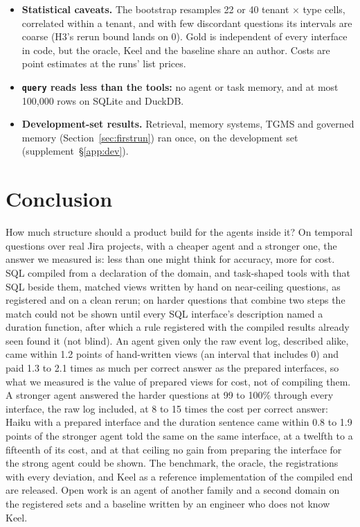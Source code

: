 \documentclass[sigconf, nonacm]{acmart}
\newcommand{\code}[1]{\texttt{#1}}
\begin{document}
\begin{itemize}[leftmargin=*]
\item \textbf{Statistical caveats.} The bootstrap resamples 22 or 40 tenant $\times$ type cells, correlated within a tenant, and with few discordant questions its intervals are coarse (H3's rerun bound lands on 0). Gold is independent of every interface in code, but the oracle, Keel and the baseline share an author. Costs are point estimates at the runs' list prices.
\item \textbf{\code{query} reads less than the tools:} no agent or task memory, and at most 100,000 rows on SQLite and DuckDB.
\item \textbf{Development-set results.} Retrieval, memory systems, TGMS and governed memory (Section~\ref{sec:firstrun}) ran once, on the development set (supplement~\S\ref{app:dev}).
\end{itemize}

\section{Conclusion}
\label{sec:conclusion}

How much structure should a product build for the agents inside it? On temporal questions over real Jira projects, with a cheaper agent and a stronger one, the answer we measured is: less than one might think for accuracy, more for cost. SQL compiled from a declaration of the domain, and task-shaped tools with that SQL beside them, matched views written by hand on near-ceiling questions, as registered and on a clean rerun; on harder questions that combine two steps the match could not be shown until every SQL interface's description named a duration function, after which a rule registered with the compiled results already seen found it (not blind). An agent given only the raw event log, described alike, came within 1.2 points of hand-written views (an interval that includes 0) and paid 1.3 to 2.1 times as much per correct answer as the prepared interfaces, so what we measured is the value of prepared views for cost, not of compiling them. A stronger agent answered the harder questions at 99 to 100\% through every interface, the raw log included, at 8 to 15 times the cost per correct answer: Haiku with a prepared interface and the duration sentence came within 0.8 to 1.9 points of the stronger agent told the same on the same interface, at a twelfth to a fifteenth of its cost, and at that ceiling no gain from preparing the interface for the strong agent could be shown. The benchmark, the oracle, the registrations with every deviation, and Keel as a reference implementation of the compiled end are released. Open work is an agent of another family and a second domain on the registered sets and a baseline written by an engineer who does not know Keel.
\end{document}
